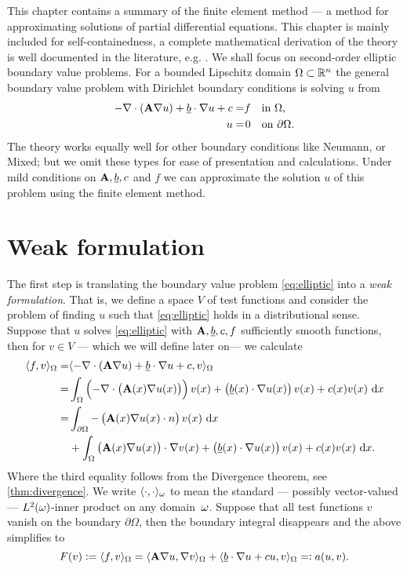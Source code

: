 \documentclass[thesis.tex]{subfiles}
\begin{document}
This chapter contains a summary of the finite element method ---
a method for approximating solutions of partial differential equations.
This chapter is mainly included for self-containedness,
a complete mathematical derivation of the theory is well documented in the literature, e.g. \cite{brenner, zienkiewicz1977finite}.
We shall focus on second-order elliptic boundary value problems. For a bounded Lipschitz domain $\Omega \subset \mathbb{R}^n$ the 
general boundary value problem with Dirichlet boundary conditions is solving $u$ from
\begin{equation}
  \label{eq:elliptic}
  \begin{alignedat}{2}
    -\nabla \cdot {\left(\mathbf{A} \nabla u\right)} + \underline{b} \cdot \nabla u + c &= &f \quad  &\text {in } \Omega,  \\
  u  &=& 0 \quad &\text{on } \partial\Omega.
  \end{alignedat}
\end{equation}
The theory works equally well for other boundary conditions like Neumann, or Mixed; but we omit
these types for ease of presentation and calculations. Under mild conditions on $\mathbf{A},\underline{b}, c$ 
and $f$ we can approximate the solution $u$ of this problem using the finite element method.

\section{Weak formulation}
The first step is translating the boundary value problem \eqref{eq:elliptic} into a \emph{weak formulation}.  
That is, we define a space $V$ of test functions and consider the problem of finding $u$ such that \eqref{eq:elliptic} holds 
in a distributional sense. Suppose that $u$ solves \eqref{eq:elliptic} with $\mathbf{A}, \underline{b}, c, f$ sufficiently smooth functions, then for $v \in V$ --- which we will define later on--- we calculate
\begin{align*}
  \ip{f,v}_{\O} = &\ip{-\nabla \cdot {\left(\mathbf{A} \nabla u\right)} + \v{b} \cdot \nabla u + c, v}_{\O} \\
  = &\int_\Omega \left( -\nabla \cdot {\left(\mathbf{A}(x) \nabla u(x)\right)}\right)v(x) + \left(\v{b}(x) \cdot \nabla u(x)\right)v(x) + c(x) v(x) \, \dif x\\
  = &\int_{\partial \Omega} -\left(\mathbf{A}(x) \nabla u(x) \cdot n\right)v(x) \, \dif x \\
  &+ \int_{\Omega} \left( \mathbf{A}(x) \nabla u(x)\right) \cdot \nabla v(x) + \left(\v{b}(x) \cdot \nabla u(x)\right)v(x) + c(x) v(x) \, \dif x.
\end{align*}
Where the third equality follows from the Divergence theorem, see \ref{thm:divergence}. We write $\langle \cdot, \cdot \rangle_{\omega}$ to mean
the standard --- possibly vector-valued --- $L^2(\omega)$-inner product on any domain~$\omega$. Suppose that all test functions $v$ vanish on the boundary $\partial \Omega$, then the boundary integral disappears and the above simplifies to
\begin{equation}
  \label{eq:ellipticweak}
  F(v) := \langle f,v \rangle_\Omega = \langle \mathbf{A} \nabla u, \nabla v \rangle_\Omega + \langle \underline{b} \cdot \nabla u + cu, v \rangle_\Omega=: a(u,v).
\end{equation}
\end{document}
